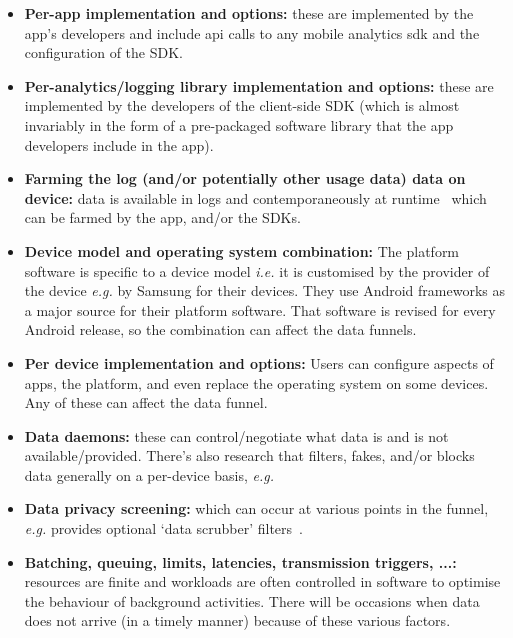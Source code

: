 \begin{itemize}
    \item \textbf{Per-app implementation and options:} these are implemented by the app's developers and include \Gls{api} calls to any mobile analytics \Gls{sdk} and the configuration of the SDK.
    \item \textbf{Per-analytics/logging library implementation and options:} these are implemented by the developers of the client-side SDK (which is almost invariably in the form of a pre-packaged software library that the app developers include in the app).
    \item \textbf{Farming the log (and/or potentially other usage data) data on device:} data is available in logs and contemporaneously at runtime~ which can be farmed by the app, and/or the SDKs. 
    \item \textbf{Device model and operating system combination:} The platform software is specific to a device model \emph{i.e.} it is customised by the provider of the device \emph{e.g.} by Samsung for their devices. They use Android frameworks as a major source for their platform software. That software is revised for every Android release, so the combination can affect the data funnels.~
    \item \textbf{Per device implementation and options:} Users can configure aspects of apps, the platform, and even replace the operating system on some devices. Any of these can affect the data funnel. 
    \item \textbf{Data daemons:} these can control/negotiate what data is and is not available/provided. There's also research that filters, fakes, and/or blocks data generally on a per-device basis, \emph{e.g.}%
    \item \textbf{Data privacy screening:} which can occur at various points in the funnel, \emph{e.g.}  provides optional `data scrubber' filters~. 
    \item \textbf{Batching, queuing, limits, latencies, transmission triggers, ...:} resources are finite and workloads are often controlled in software to optimise the behaviour of background activities. There will be occasions when data does not arrive (in a timely manner) because of these various factors.

\end{itemize}
